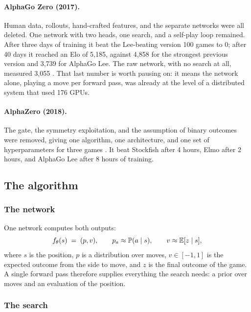 \paragraph{AlphaGo Zero (2017).} Human data, rollouts, hand-crafted features, and
the separate networks were all deleted. One network with two heads, one search,
and a self-play loop remained. After three days of training it beat the
Lee-beating version 100 games to 0; after 40 days it reached an Elo of 5{,}185,
against 4{,}858 for the strongest previous version and 3{,}739 for AlphaGo Lee.
The raw network, with no search at all, measured 3{,}055 \citep{silver2017alphagozero}.
That last number is worth pausing on: it means the network alone, playing a move
per forward pass, was already at the level of a distributed system that used 176
GPUs.

\paragraph{AlphaZero (2018).} The gate, the symmetry exploitation, and the
assumption of binary outcomes were removed, giving one algorithm, one
architecture, and one set of hyperparameters for three games
\citep{silver2018alphazero}. It beat Stockfish after 4 hours, Elmo after 2 hours,
and AlphaGo Lee after 8 hours of training.

\subsection{The algorithm}
\label{sec:algorithm}

\subsubsection{The network}

One network computes both outputs:
\begin{equation}
f_\theta(s) \;=\; (p, v), \qquad
p_a \approx \mathbb{P}(a \mid s), \qquad v \approx \mathbb{E}[z \mid s],
\end{equation}
where $s$ is the position, $p$ is a distribution over moves, $v \in [-1,1]$ is
the expected outcome from the side to move, and $z$ is the final outcome of the
game. A single forward pass therefore supplies everything the search needs: a
prior over moves and an evaluation of the position.

\subsubsection{The search}

